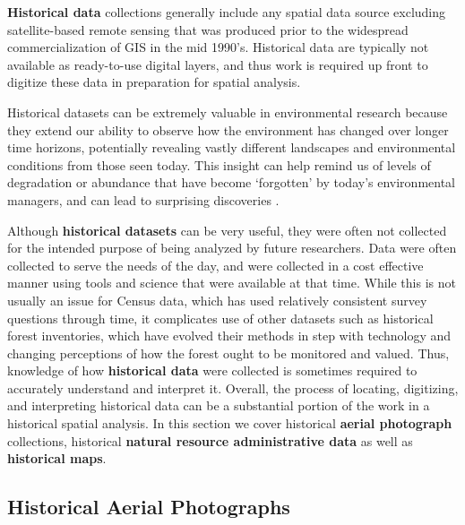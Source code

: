 \documentclass[
]{book}
\begin{document}
\textbf{Historical data} collections generally include any spatial data source excluding satellite-based remote sensing that was produced prior to the widespread commercialization of GIS in the mid 1990's. Historical data are typically not available as ready-to-use digital layers, and thus work is required up front to digitize these data in preparation for spatial analysis.

Historical datasets can be extremely valuable in environmental research because they extend our ability to observe how the environment has changed over longer time horizons, potentially revealing vastly different landscapes and environmental conditions from those seen today. This insight can help remind us of levels of degradation or abundance that have become `forgotten' by today's environmental managers, and can lead to surprising discoveries \citep{mcclenachan_importance_2015}.

Although \textbf{historical datasets} can be very useful, they were often not collected for the intended purpose of being analyzed by future researchers. Data were often collected to serve the needs of the day, and were collected in a cost effective manner using tools and science that were available at that time. While this is not usually an issue for Census data, which has used relatively consistent survey questions through time, it complicates use of other datasets such as historical forest inventories, which have evolved their methods in step with technology and changing perceptions of how the forest ought to be monitored and valued. Thus, knowledge of how \textbf{historical data} were collected is sometimes required to accurately understand and interpret it. Overall, the process of locating, digitizing, and interpreting historical data can be a substantial portion of the work in a historical spatial analysis. In this section we cover historical \textbf{aerial photograph} collections, historical \textbf{natural resource administrative data} as well as \textbf{historical maps}.

\subsection{Historical Aerial Photographs}\label{historical-aerial-photographs}
\end{document}
